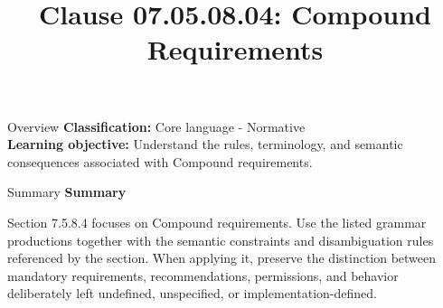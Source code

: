 \documentclass[10pt,letterpaper]{article}
\title{Clause 07.05.08.04: Compound Requirements}
\author{}
\date{}
\begin{document}
\maketitle
\begin{CornellOverviewBox}{Overview}
\textbf{Classification:} Core language - Normative\\[2pt]
\textbf{Learning objective:} Understand the rules, terminology, and semantic consequences associated with Compound requirements.
\end{CornellOverviewBox}\begin{CornellSummaryBox}{Summary}
{\sffamily\bfseries\color{Accent} Summary}\par\vspace{3pt}Section 7.5.8.4 focuses on Compound requirements. Use the listed grammar productions together with the semantic constraints and disambiguation rules referenced by the section. When applying it, preserve the distinction between mandatory requirements, recommendations, permissions, and behavior deliberately left undefined, unspecified, or implementation-defined.
\end{CornellSummaryBox}
\end{document}
